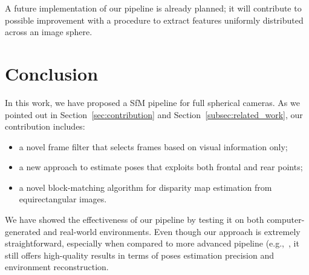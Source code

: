 A future implementation of our pipeline is already planned; it will contribute
to possible improvement with a procedure to extract features uniformly
distributed across an image sphere. 

\section{Conclusion}
In this work, we have proposed a SfM pipeline for full spherical cameras.
As we pointed out in Section~\ref{sec:contribution} and
Section~\ref{subsec:related_work}, our contribution includes:
%
\begin{itemize}
	\item a novel frame filter that selects frames based on visual
	information only;
	\item a new approach to estimate poses that exploits both frontal and rear
	points;
	\item a novel block-matching algorithm for disparity map estimation from
	equirectangular images.
\end{itemize}
%
We have showed the effectiveness of our pipeline by testing it on 
both computer-generated and real-world environments.
Even though our approach is extremely straightforward, especially when compared to more advanced pipeline (e.g.,~\cite{schonberger2016structure}, it still offers high-quality results in terms of
poses estimation precision and environment reconstruction.
